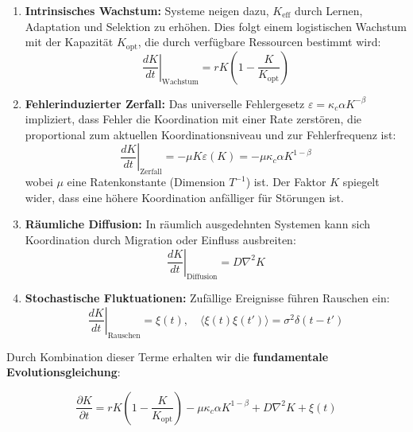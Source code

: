 \documentclass[12pt,a4paper]{article}
\theoremstyle{remark}
\newcommand{\Keff}{K_{\mathrm{eff}}}
\newcommand{\Keffopt}{K_{\mathrm{opt}}}
\newcommand{\kappac}{\kappa_c}
\newcommand{\eps}{\varepsilon}
\begin{document}
	\begin{enumerate}
		\item \textbf{Intrinsisches Wachstum:} Systeme neigen dazu, $\Keff$ durch Lernen, Adaptation und Selektion zu erhöhen. Dies folgt einem logistischen Wachstum mit der Kapazität $\Keffopt$, die durch verfügbare Ressourcen bestimmt wird:
		\begin{equation}
			\left.\frac{dK}{dt}\right|_{\text{Wachstum}} = r K \left(1 - \frac{K}{\Keffopt}\right)
			\label{eq:growth}
		\end{equation}
		
		\item \textbf{Fehlerinduzierter Zerfall:} Das universelle Fehlergesetz $\eps = \kappac \alpha K^{-\beta}$ impliziert, dass Fehler die Koordination mit einer Rate zerstören, die proportional zum aktuellen Koordinationsniveau und zur Fehlerfrequenz ist:
		\begin{equation}
			\left.\frac{dK}{dt}\right|_{\text{Zerfall}} = -\mu K \eps(K) = -\mu \kappac \alpha K^{1-\beta}
			\label{eq:decay}
		\end{equation}
		wobei $\mu$ eine Ratenkonstante (Dimension $T^{-1}$) ist. Der Faktor $K$ spiegelt wider, dass eine höhere Koordination anfälliger für Störungen ist.
		
		\item \textbf{Räumliche Diffusion:} In räumlich ausgedehnten Systemen kann sich Koordination durch Migration oder Einfluss ausbreiten:
		\begin{equation}
			\left.\frac{dK}{dt}\right|_{\text{Diffusion}} = D \nabla^2 K
			\label{eq:diffusion}
		\end{equation}
		
		\item \textbf{Stochastische Fluktuationen:} Zufällige Ereignisse führen Rauschen ein:
		\begin{equation}
			\left.\frac{dK}{dt}\right|_{\text{Rauschen}} = \xi(t), \quad \langle \xi(t)\xi(t')\rangle = \sigma^2 \delta(t-t')
			\label{eq:noise}
		\end{equation}
	\end{enumerate}
	
	Durch Kombination dieser Terme erhalten wir die \textbf{fundamentale Evolutionsgleichung}:
	
	\begin{equation}
		\boxed{\frac{\partial K}{\partial t} = r K \left(1 - \frac{K}{\Keffopt}\right) - \mu \kappac \alpha K^{1-\beta} + D \nabla^2 K + \xi(t)}
		\label{eq:evolution}
	\end{equation}
	
\end{document}

